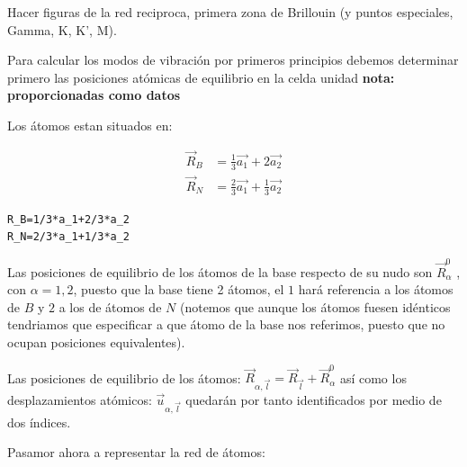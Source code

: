 \documentclass[12pt,a4paper]{article}
\begin{document}
\vspace{0.5cm}
\color{red}
Hacer figuras de la red reciproca, primera zona de Brillouin (y puntos especiales, Gamma, K, K', M).
\normalcolor

\vspace{0.7cm}
Para calcular los modos de vibración por primeros principios debemos determinar primero las posiciones atómicas de equilibrio  en la celda unidad \textbf{\textbf{nota: proporcionadas como datos}}

Los átomos estan situados en:

\begin{equation}
\begin{aligned}
\vec R_B&=\frac{1}{3}\vec{a_1}+2\vec{a_2}\\
\vec R_N&=\frac{2}{3}\vec{a_1}+\frac{1}{3}\vec{a_2}
\end{aligned}
\end{equation}

\begin{verbatim}
R_B=1/3*a_1+2/3*a_2
R_N=2/3*a_1+1/3*a_2
\end{verbatim}

Las posiciones de equilibrio de los átomos de la base respecto de su nudo son \(\vec{R}_\alpha^0\) , con \(\alpha=1,2\), puesto que la base tiene 2 átomos, el \(1\) hará referencia a los átomos de \(B\) y \(2\) a los de átomos de \(N\) (notemos que aunque los átomos fuesen idénticos tendriamos que especificar a que átomo de la base nos referimos, puesto que no ocupan posiciones equivalentes).


Las posiciones de equilibrio de los átomos: \(\vec R_{\alpha,\vec l}=\vec{R}_{\vec{l}} + \vec R_\alpha^0\)  así como los desplazamientos atómicos: \(\vec u_{\alpha,\vec l}\) quedarán por tanto identificados por medio de dos índices.

Pasamor ahora a representar la red de átomos:
\end{document}
